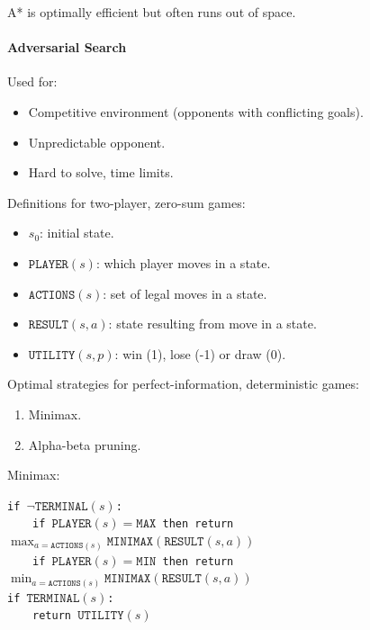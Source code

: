 \documentclass[twocolumn,english]{article}
\begin{document}
A{*} is optimally efficient but often runs out of space.

\paragraph{Adversarial Search}

Used for:
\begin{itemize}
\item Competitive environment (opponents with conflicting goals).
\item Unpredictable opponent.
\item Hard to solve, time limits.
\end{itemize}
Definitions for two-player, zero-sum games:
\begin{itemize}
\item $s_{0}$: initial state.
\item $\texttt{PLAYER}\left(s\right)$: which player moves in a state.
\item $\texttt{ACTIONS}\left(s\right)$: set of legal moves in a state.
\item $\texttt{RESULT}\left(s,a\right)$: state resulting from move in a
state.
\item $\texttt{UTILITY}\left(s,p\right)$: win (1), lose (-1) or draw (0).
\end{itemize}
Optimal strategies for perfect-information, deterministic games:
\begin{enumerate}
\item Minimax.
\item Alpha-beta pruning.
\end{enumerate}
Minimax:

\texttt{}
\begin{table}[H]
\raggedright{}\texttt{\small{}if $\lnot\texttt{TERMINAL}\left(s\right)$:}~\\
\texttt{\small{}$\qquad$if $\texttt{PLAYER}\left(s\right)=\texttt{MAX}$
then return $\max_{a=\texttt{ACTIONS}\left(s\right)}\texttt{MINIMAX}\left(\texttt{RESULT}\left(s,a\right)\right)$}~\\
\texttt{\small{}$\qquad$if $\texttt{PLAYER}\left(s\right)=\texttt{MIN}$
then return $\min_{a=\texttt{ACTIONS}\left(s\right)}\texttt{MINIMAX}\left(\texttt{RESULT}\left(s,a\right)\right)$}~\\
\texttt{\small{}if $\texttt{TERMINAL}\left(s\right)$:}~\\
\texttt{\small{}$\qquad$return $\texttt{UTILITY}\left(s\right)$}
\end{table}
\end{document}
